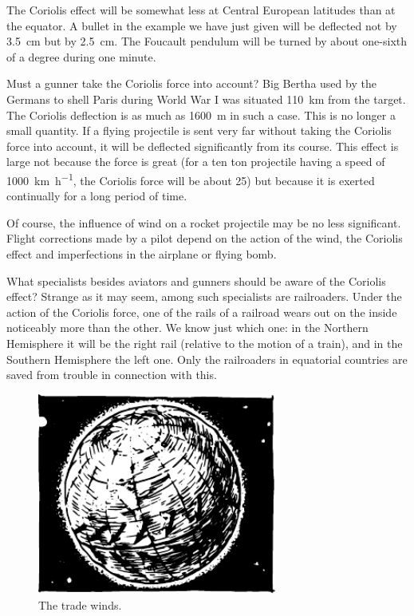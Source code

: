 The Coriolis effect will be somewhat less at Central European latitudes than at the equator. A bullet in the example we have just given will be deflected not by \SI{3.5}{\centi\meter} but by \SI{2.5}{\centi\meter}. The Foucault pendulum will be turned by about one-sixth of a degree during one minute.

Must a gunner take the Coriolis force into account?
Big Bertha used by the Germans to shell Paris during
World War I was situated \SI{110}{\kilo\meter} from the target. The
Coriolis deflection is as much as \SI{1600}{\meter} in such a case.
This is no longer a small quantity. If a flying projectile
is sent very far without taking the Coriolis force into
account, it will be deflected significantly from its course.
This effect is large not because the force is great (for a ten
ton projectile having a speed of \SI{1000}{\kilo\meter\per\hour}, the Coriolis force will be about \SI{25}{\kgf}) but because it is exerted
continually for a long period of time.

Of course, the influence of wind on a rocket projectile
may be no less significant. Flight corrections made by
a pilot depend on the action of the wind, the Coriolis
effect and imperfections in the airplane or flying bomb.

What specialists besides aviators and gunners should
be aware of the Coriolis effect? Strange as it may seem,
among such specialists are railroaders. Under the action
of the Coriolis force, one of the rails of a railroad wears
out on the inside noticeably more than the other. We
know just which one: in the Northern Hemisphere it will
be the right rail (relative to the motion of a train), and
in the Southern Hemisphere the left one. Only the railroaders in equatorial countries are saved from trouble
in connection with this.

\begin{figure}[!ht]
\centering
\includegraphics[width=0.7\textwidth]{figures/fig-02-17.pdf}
\caption{The trade winds.}
\label{fig-2.17}
\end{figure}


